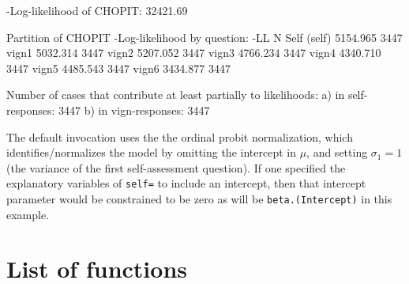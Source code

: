 \documentclass{amsart}
\newcommand{\code}[1]{{\texttt{#1}}}
\begin{document}
\begin{Schunk}
\begin{Soutput}
-Log-likelihood of CHOPIT:  32421.69 

Partition of CHOPIT -Log-likelihood by question:
                 -LL    N
Self (self) 5154.965 3447
vign1       5032.314 3447
vign2       5207.052 3447
vign3       4766.234 3447
vign4       4340.710 3447
vign5       4485.543 3447
vign6       3434.877 3447

Number of cases that contribute at least partially to likelihoods:
   a) in self-responses: 3447 
   b) in vign-responses: 3447 
\end{Soutput}
\end{Schunk}

The default invocation uses the the ordinal probit normalization,
which identifies/normalizes the model by omitting the intercept in
$\mu$, and setting $\sigma_1=1$ (the variance of the first
self-assessment question).  If one specified the explanatory variables
of \code{self=} to include an intercept, then that intercept parameter
would be constrained to be zero as will be \code{beta.(Intercept)} in
this example.




% 
% 

\section{List of functions}
\end{document}
